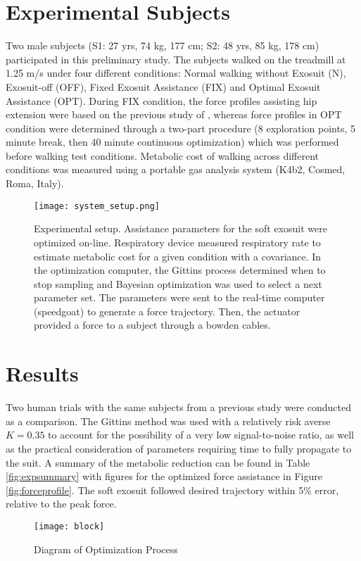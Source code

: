 \section{Experimental Subjects}
Two male subjects (S1: 27 yrs, 74 kg, 177 cm; S2: 48 yrs, 85 kg, 178 cm) participated in this preliminary study. The subjects walked on the treadmill at 1.25 m/s under four different conditions: Normal walking without Exosuit (N), Exosuit-off (OFF), Fixed Exosuit Assistance (FIX) and Optimal Exosuit Assistance (OPT). During FIX condition, the force profiles assisting hip extension were based on the previous study of \citep{Ding2016}, whereas force profiles in OPT condition were determined through a two-part procedure (8 exploration points, 5 minute break, then 40 minute continuous optimization) which was performed before walking test conditions. Metabolic cost of walking across different conditions was measured using a portable gas analysis system (K4b2, Cosmed, Roma, Italy).

\begin{figure}[t]
\centering
\texttt{[image: system\_setup.png]}
\caption{Experimental setup. Assistance parameters for the soft exosuit were optimized on-line. Respiratory device measured respiratory rate to estimate metabolic cost for a given condition with a covariance. In the optimization computer, the Gittins process determined when to stop sampling and Bayesian optimization was used to select a next parameter set. The parameters were sent to the real-time computer (speedgoat) to generate a force trajectory. Then, the actuator provided a force to a subject through a bowden cables. }
\label{fig:expsetup}
\end{figure}

\section{Results}
Two human trials with the same subjects from a previous study were conducted as a comparison. The Gittins method was used with a relatively risk averse $K=0.35$ to account for the possibility of a very low signal-to-noise ratio, as well as the practical consideration of parameters requiring time to fully propagate to the suit. A summary of the metabolic reduction can be found in Table \ref{fig:expsummary} with figures for the optimized force assistance in Figure \ref{fig:forceprofile}. The soft exosuit followed desired trajectory within 5\% error, relative to the peak force.

\begin{figure}[t]
\centering
\texttt{[image: block]}
\caption{Diagram of Optimization Process}
\label{fig:block}
\end{figure}

